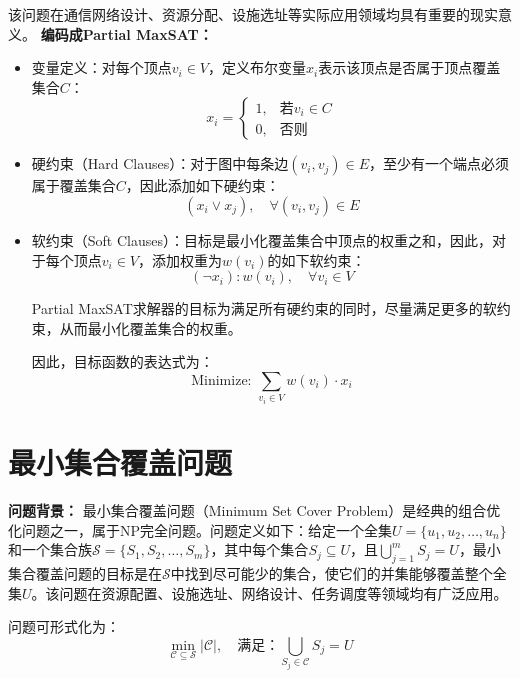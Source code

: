 \documentclass{article}
\begin{document}
该问题在通信网络设计、资源分配、设施选址等实际应用领域均具有重要的现实意义。
\textbf{编码成Partial MaxSAT：}
\begin{itemize}
    \item 变量定义：对每个顶点$v_i\in V$，定义布尔变量$x_i$表示该顶点是否属于顶点覆盖集合$C$：
    \[
    x_i=
    \begin{cases}
    1, & \text{若$v_i\in C$}\\[4pt]
    0, & \text{否则}
    \end{cases}
    \]

    \item 硬约束（Hard Clauses）：对于图中每条边$(v_i,v_j)\in E$，至少有一个端点必须属于覆盖集合$C$，因此添加如下硬约束：
    \[
    (x_i \vee x_j),\quad\forall (v_i,v_j)\in E
    \]

    \item 软约束（Soft Clauses）：目标是最小化覆盖集合中顶点的权重之和，因此，对于每个顶点$v_i\in V$，添加权重为$w(v_i)$的如下软约束：
    \[
    (\neg x_i): w(v_i),\quad\forall v_i\in V
    \]

    Partial MaxSAT求解器的目标为满足所有硬约束的同时，尽量满足更多的软约束，从而最小化覆盖集合的权重。

    因此，目标函数的表达式为：
    \[
    \text{Minimize: } \sum_{v_i\in V} w(v_i)\cdot x_i
    \]

\end{itemize}
\newpage
\section*{最小集合覆盖问题}
\textbf{问题背景：}
最小集合覆盖问题（Minimum Set Cover Problem）是经典的组合优化问题之一，属于NP完全问题。问题定义如下：给定一个全集$U=\{u_1,u_2,\dots,u_n\}$和一个集合族$\mathcal{S}=\{S_1,S_2,\dots,S_m\}$，其中每个集合$S_j \subseteq U$，且$\bigcup_{j=1}^m S_j = U$，最小集合覆盖问题的目标是在$\mathcal{S}$中找到尽可能少的集合，使它们的并集能够覆盖整个全集$U$。该问题在资源配置、设施选址、网络设计、任务调度等领域均有广泛应用。

问题可形式化为：
\[
\min_{\mathcal{C}\subseteq \mathcal{S}} |\mathcal{C}|,\quad \text{满足：} \bigcup_{S_j \in \mathcal{C}} S_j = U
\]
\end{document}
